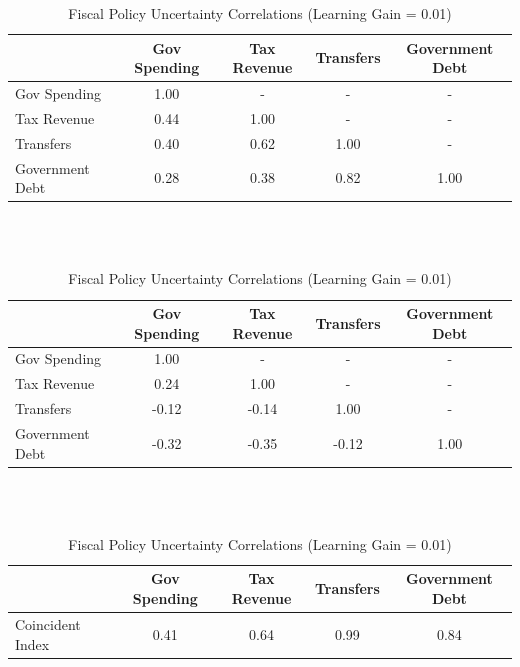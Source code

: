 \documentclass[11pt]{article}
\begin{document}
\begin{table}[t]\caption{Fiscal Policy Uncertainty Correlations (Learning Gain = 0.01)}\label{tb:fpucorrel0.01}
\begin{center}
\begin{tabular}{l|cccc}
 & Gov Spending & Tax Revenue & Transfers & Government Debt \\ \hline
Gov Spending & 1.00 & - & - & - \\
Tax Revenue & 0.44 & 1.00 & - & - \\
Transfers & 0.40 & 0.62 & 1.00 & - \\
Government Debt & 0.28 & 0.38 & 0.82 & 1.00 \\ \hline
\end{tabular}

\ \\ \ \\
\begin{tabular}{l|cccc}
 & Gov Spending & Tax Revenue & Transfers & Government Debt \\ \hline
Gov Spending & 1.00 & - & - & - \\
Tax Revenue & 0.24 & 1.00 & - & - \\
Transfers & -0.12 & -0.14 & 1.00 & - \\
Government Debt & -0.32 & -0.35 & -0.12 & 1.00 \\ \hline
\end{tabular}

\ \\ \ \\

\begin{tabular}{l|cccc}
 & Gov Spending & Tax Revenue & Transfers & Government Debt \\ \hline
Coincident Index~ & 0.41 & 0.64 & 0.99 & 0.84 \\ \hline
\end{tabular}
\end{center}
\end{table}

\ \\ \newpage
\end{document}
